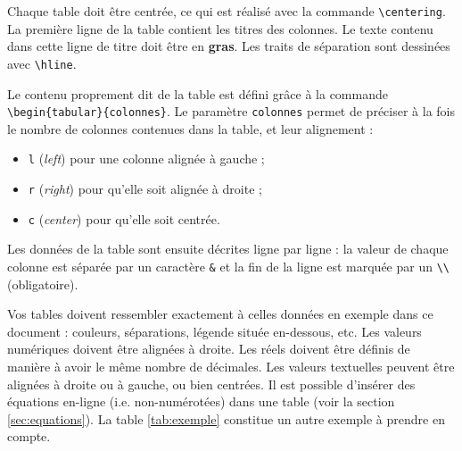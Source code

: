 \documentclass{ceri}
\begin{document}
Chaque table doit être centrée, ce qui est réalisé avec la commande \texttt{\textbackslash{}centering}. La première ligne de la table contient les titres des colonnes. Le texte contenu dans cette ligne de titre doit être en \textbf{gras}. Les traits de séparation sont dessinées avec \texttt{\textbackslash{}hline}.
	
Le contenu proprement dit de la table est défini grâce à la commande \texttt{\textbackslash{}begin\{tabular\}\{colonnes\}}. Le paramètre \texttt{colonnes} permet de préciser à la fois le nombre de colonnes contenues dans la table, et leur alignement : 
\begin{itemize}
	\item \texttt{l} (\textit{left}) pour une colonne alignée à gauche ;
	\item \texttt{r} (\textit{right}) pour qu'elle soit alignée à droite ;
	\item \texttt{c} (\textit{center}) pour qu'elle soit centrée.
\end{itemize}

Les données de la table sont ensuite décrites ligne par ligne : la valeur de chaque colonne est séparée par un caractère \texttt{\&} et la fin de la ligne est marquée par un \texttt{\textbackslash{}\textbackslash{}} (obligatoire).
	
Vos tables doivent ressembler exactement à celles données en exemple dans ce document : couleurs, séparations, légende située en-dessous, etc. Les valeurs numériques doivent être alignées à droite. Les réels doivent être définis de manière à avoir le même nombre de décimales. Les valeurs textuelles peuvent être alignées à droite ou à gauche, ou bien centrées. Il est possible d'insérer des équations en-ligne (i\@.e\@. non-numérotées) dans une table (voir la section \ref{sec:equations}). La table \ref{tab:exemple} constitue un autre exemple à prendre en compte.
	
\end{document}
